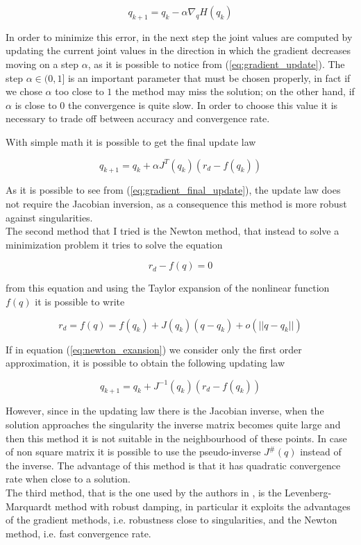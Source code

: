 \documentclass[a4paper]{article}
\begin{document}
\begin{equation}
q_{k+1} = q_k-\alpha \nabla_qH(q_k)
\label{eq:gradient_update}
\end{equation}

In order to minimize this error,  in the next step the joint values are computed by updating the current joint values in the direction in which the gradient decreases moving on a step $\alpha$, as it is possible to notice from (\ref{eq:gradient_update}). The step $\alpha \in (0,1]$ is an important parameter that must be chosen properly, in fact if we chose $\alpha$ too close to $1$ the method may miss the solution; on the other hand, if $\alpha$ is close to $0$ the convergence is quite slow. In order to choose this value it is necessary to trade off between accuracy and convergence rate.



With simple math it is possible to get the final update law 

\begin{equation}
q_{k+1} = q_k+\alpha J^T(q_k)(r_d-f(q_k))
\label{eq:gradient_final_update}
\end{equation}

As it is possible to see from (\ref{eq:gradient_final_update}), the update law does not require the Jacobian inversion, as a consequence this method is more robust against singularities.\\
The second method that I tried is the Newton method, that instead to solve a minimization problem it tries to solve the equation  


\begin{equation}
r_d-f(q) = 0
\label{eq:newton_err}
\end{equation}

from this equation and using the Taylor expansion of the nonlinear function $f(q)$ it is possible to write

\begin{equation}
r_d = f(q) = f(q_k)+J(q_k)(q-q_k)+o(||q-q_k||)
\label{eq:newton_exansion}
\end{equation}

If in equation (\ref{eq:newton_exansion}) we consider only the first order approximation, it is possible to obtain the following updating law 

\begin{equation}
q_{k+1} = q_k+J^{-1}(q_k)(r_d-f(q_k))
\label{eq:newton_update}
\end{equation}

However, since in the updating law there is the Jacobian inverse, when the solution approaches the singularity the inverse matrix becomes quite large and then this method it is not suitable in the neighbourhood of these points. In case of non square matrix it is possible to use the pseudo-inverse $J^\#(q)$ instead of the inverse. The advantage of this method is that it has quadratic convergence rate when close to a solution. \\
The third method, that is the one used by the authors in \cite{Kaj1}, is the Levenberg-Marquardt method with robust damping, in particular it exploits the advantages of the gradient methods, i.e. robustness close to singularities, and the Newton method, i.e. fast convergence rate. 
\end{document}
